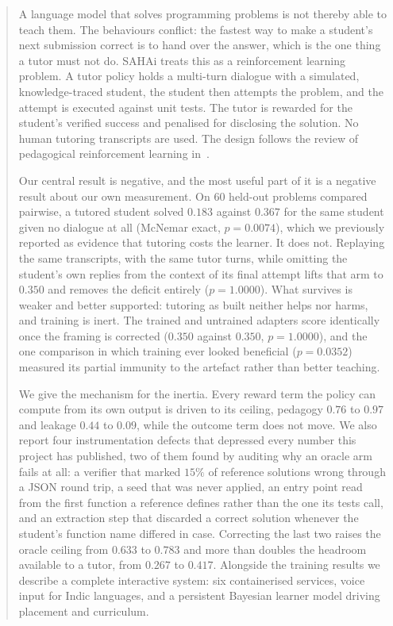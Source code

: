 \begin{abstract}
A language model that solves programming problems is not thereby able to teach
them. The behaviours conflict: the fastest way to make a student's next
submission correct is to hand over the answer, which is the one thing a tutor
must not do. SAHAi treats this as a reinforcement learning problem. A tutor
policy holds a multi-turn dialogue with a simulated, knowledge-traced student,
the student then attempts the problem, and the attempt is executed against unit
tests. The tutor is rewarded for the student's verified success and penalised
for disclosing the solution. No human tutoring transcripts are used. The design
follows the review of pedagogical reinforcement learning in~\cite{rev-pedrl}.

Our central result is negative, and the most useful part of it is a negative
result about our own measurement. On 60 held-out problems compared pairwise, a
tutored student solved $0.183$ against $0.367$ for the same student given no
dialogue at all (McNemar exact, $p{=}0.0074$), which we previously reported as
evidence that tutoring costs the learner. It does not. Replaying the same
transcripts, with the same tutor turns, while omitting the student's own replies
from the context of its final attempt lifts that arm to $0.350$ and removes the
deficit entirely ($p{=}1.0000$). What survives is weaker and better supported:
tutoring as built neither helps nor harms, and training is inert. The trained
and untrained adapters score identically once the framing is corrected ($0.350$
against $0.350$, $p{=}1.0000$), and the one comparison in which training ever
looked beneficial ($p{=}0.0352$) measured its partial immunity to the artefact
rather than better teaching.

We give the mechanism for the inertia. Every reward term the policy can compute
from its own output is driven to its ceiling, pedagogy $0.76$ to $0.97$ and
leakage $0.44$ to $0.09$, while the outcome term does not move. We also report
four instrumentation defects that depressed every number this project has
published, two of them found by auditing why an oracle arm fails at all: a
verifier that marked $15\%$ of reference solutions wrong through a JSON round
trip, a seed that was never applied, an entry point read from the first function
a reference defines rather than the one its tests call, and an extraction step
that discarded a correct solution whenever the student's function name differed
in case. Correcting the last two raises the oracle ceiling from $0.633$ to
$0.783$ and more than doubles the headroom available to a tutor, from $0.267$ to
$0.417$. Alongside the training results we describe a complete interactive
system: six containerised services, voice input for Indic languages, and a
persistent Bayesian learner model driving placement and curriculum.
\end{abstract}



